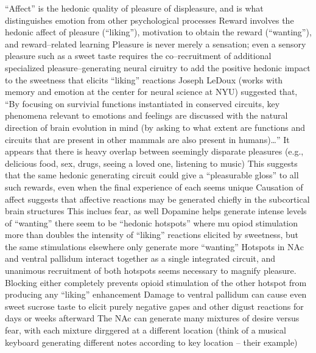 \documentclass[11pt, a4paper, oneside]{article}   	%
\begin{document}
\begin{outline}
    \point ``Affect'' is the hedonic quality of pleasure of displeasure, and is what distinguishes emotion from other psychological processes
    \point Reward involves the hedonic affect of pleasure (``liking''), motivation to obtain the reward (``wanting''), and reward--related learning
    \point Pleasure is never merely a sensation; even a sensory pleasure such as a sweet taste requires the co--recruitment of additional specialized pleasure--generating neural ciruitry to add the positive hedonic impact to the sweetness that elicits ``liking'' reactions
    \point Joseph LeDoux (works with memory and emotion at the center for neural science at NYU) suggested that, ``By focusing on survivial functions instantiated in conserved circuits, key phenomena relevant to emotions and feelings are discussed with the natural direction of brain evolution in mind (by asking to what extent are functions and circuits that are present in other mammals are also present in humans)\ldots''
    \point It appears that there is heavy overlap between seemingly disparate pleasures (e.g., delicious food, sex, drugs, seeing a loved one, listening to music)
        \subpoint This suggests that the same hedonic generating circuit could give a ``pleasurable gloss'' to all such rewards, even when the final experience of each seems unique
    \point Causation of affect suggests that affective reactions may be generated chiefly in the subcortical brain structures 
        \subpoint This inclues fear, as well
    \point Dopamine helps generate intense levels of ``wanting''
    \point there seem to be ``hedonic hotspots'' where mu opiod stimulation more than doubles the intensity of ``liking'' reactions elicited by sweetness, but the same stimulations elsewhere only generate more ``wanting''
    \point Hotspots in NAc and ventral pallidum interact together as a single integrated circuit, and unanimous recruitment of both hotspots seems necessary to magnify pleasure. Blocking either completely prevents opioid stimulation of the other hotspot from producing any ``liking'' enhancement
    \point Damage to ventral pallidum can cause even sweet sucrose taste to elicit purely negative gapes and other digust reactions for days or weeks afterward
    \point The NAc can generate many mixtures of desire versus fear, with each mixture dirggered at a different location (think of a musical keyboard generating different notes according to key location -- their example)
\end{outline}
\end{document}

